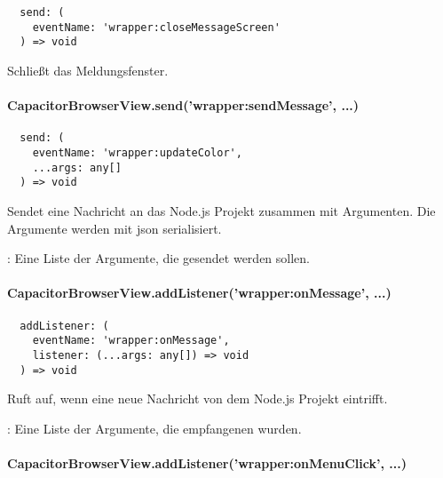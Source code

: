 \begin{verbatim}
  send: (
    eventName: 'wrapper:closeMessageScreen'
  ) => void
\end{verbatim}

Schließt das Meldungsfenster.


\paragraph{CapacitorBrowserView.send('wrapper:sendMessage', ...)}

\begin{verbatim}
  send: (
    eventName: 'wrapper:updateColor',
    ...args: any[]
  ) => void
\end{verbatim}

Sendet eine Nachricht an das Node.js Projekt zusammen mit Argumenten.
Die Argumente werden mit \ac{json} serialisiert.

\begin{arguments}
  \item {}: Eine Liste der Argumente, die gesendet werden sollen.
\end{arguments}


\paragraph{CapacitorBrowserView.addListener('wrapper:onMessage', ...)}

\begin{verbatim}
  addListener: (
    eventName: 'wrapper:onMessage',
    listener: (...args: any[]) => void
  ) => void
\end{verbatim}

Ruft  auf, wenn eine neue Nachricht von dem Node.js Projekt eintrifft.

\begin{arguments}
  \item {}: Eine Liste der Argumente, die empfangenen wurden.
\end{arguments}


\paragraph{CapacitorBrowserView.addListener('wrapper:onMenuClick', ...)}

